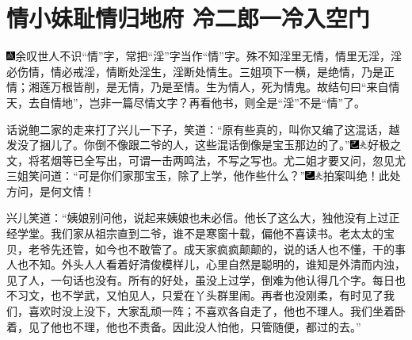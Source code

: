 
\chapter{情小妹耻情归地府 冷二郎一冷入空门}

{\includegraphics[width=3mm]{../Images/00005}\kaishu 余叹世人不识``情''字，常把``淫''字当作``情''字。殊不知淫里无情，情里无淫，淫必伤情，情必戒淫，情断处淫生，淫断处情生。三姐项下一横，是绝情，乃是正情；湘莲万根皆削，是无情，乃是至情。生为情人，死为情鬼。故结句曰``来自情天，去自情地''，岂非一篇尽情文字？再看他书，则全是``淫''不是``情''了。}

话说鲍二家的走来打了兴儿一下子，笑道：``原有些真的，叫你又编了这混话，越发没了捆儿了。你倒不像跟二爷的人，这些混话倒像是宝玉那边的了。''{\includegraphics[width=3mm]{../Images/00003}\includegraphics[width=3mm]{../Images/00012}\footnotesize \kaishu 好极之文，将茗烟等已全写出，可谓一击两鸣法，不写之写也。}尤二姐才要又问，忽见尤三姐笑问道：``可是你们家那宝玉，除了上学，他作些什么？''{\includegraphics[width=3mm]{../Images/00003}\includegraphics[width=3mm]{../Images/00012}\footnotesize \kaishu 拍案叫绝！此处方问，是何文情！}

兴儿笑道：``姨娘别问他，说起来姨娘也未必信。他长了这么大，独他没有上过正经学堂。我们家从祖宗直到二爷，谁不是寒窗十载，偏他不喜读书。老太太的宝贝，老爷先还管，如今也不敢管了。成天家疯疯颠颠的，说的话人也不懂，干的事人也不知。外头人人看着好清俊模样儿，心里自然是聪明的，谁知是外清而内浊，见了人，一句话也没有。所有的好处，虽没上过学，倒难为他认得几个字。每日也不习文，也不学武，又怕见人，只爱在丫头群里闹。再者也没刚柔，有时见了我们，喜欢时没上没下，大家乱顽一阵；不喜欢各自走了，他也不理人。我们坐着卧着，见了他也不理，他也不责备。因此没人怕他，只管随便，都过的去。''

